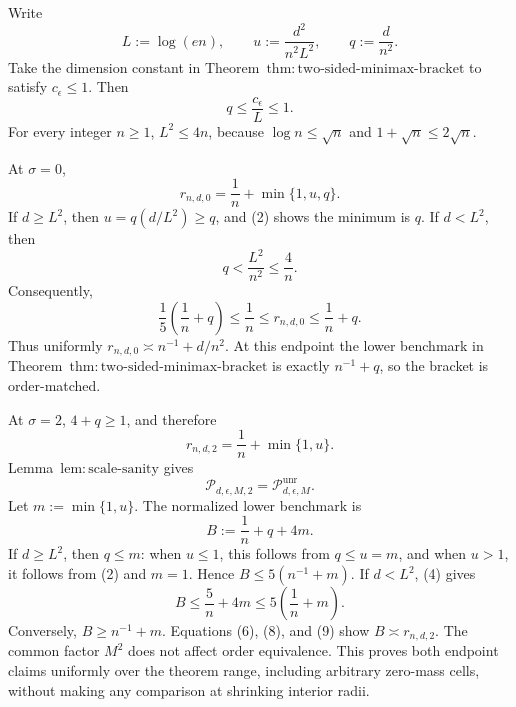 Write
\[
 L:=\log(en),\qquad
 u:=\frac{d^2}{n^2L^2},\qquad
 q:=\frac d{n^2}.
\tag{1}
\]
Take the dimension constant in Theorem~\(\mathrm{thm:two\text{-}sided\text{-}minimax\text{-}bracket}\) to satisfy \(c_{\epsilon}\le1\).  Then
\[
 q\le\frac{c_{\epsilon}}L\le1.
\tag{2}
\]
For every integer \(n\ge1\), \(L^2\le4n\), because \(\log n\le\sqrt n\) and \(1+\sqrt n\le2\sqrt n\).

At \(\sigma=0\),
\[
 r_{n,d,0}=\frac1n+\min\{1,u,q\}.
\tag{3}
\]
If \(d\ge L^2\), then \(u=q(d/L^2)\ge q\), and (2) shows the minimum is \(q\).  If \(d<L^2\), then
\[
 q<\frac{L^2}{n^2}\le\frac4n.
\tag{4}
\]
Consequently,
\[
 \frac15\left(\frac1n+q\right)
 \le \frac1n
 \le r_{n,d,0}
 \le \frac1n+q.
\tag{5}
\]
Thus uniformly \(r_{n,d,0}\asymp n^{-1}+d/n^2\).  At this endpoint the lower benchmark in Theorem~\(\mathrm{thm:two\text{-}sided\text{-}minimax\text{-}bracket}\) is exactly \(n^{-1}+q\), so the bracket is order-matched.

At \(\sigma=2\), \(4+q\ge1\), and therefore
\[
 r_{n,d,2}=\frac1n+\min\{1,u\}.
\tag{6}
\]
Lemma~\(\mathrm{lem:scale\text{-}sanity}\) gives
\[
 \mathcal P_{d,\epsilon,M,2}=\mathcal P_{d,\epsilon,M}^{\mathrm{unr}}.
\tag{7}
\]
Let \(m:=\min\{1,u\}\).  The normalized lower benchmark is
\[
 B:=\frac1n+q+4m.
\tag{8}
\]
If \(d\ge L^2\), then \(q\le m\): when \(u\le1\), this follows from \(q\le u=m\), and when \(u>1\), it follows from (2) and \(m=1\).  Hence \(B\le5(n^{-1}+m)\).  If \(d<L^2\), (4) gives
\[
 B\le\frac5n+4m\le5\left(\frac1n+m\right).
\tag{9}
\]
Conversely, \(B\ge n^{-1}+m\).  Equations (6), (8), and (9) show \(B\asymp r_{n,d,2}\).  The common factor \(M^2\) does not affect order equivalence.  This proves both endpoint claims uniformly over the theorem range, including arbitrary zero-mass cells, without making any comparison at shrinking interior radii.